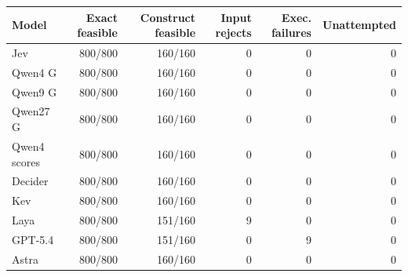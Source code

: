 \begin{tabular}{lrrrrr}
\toprule
Model & Exact feasible & Construct feasible & Input rejects & Exec. failures & Unattempted \\
\midrule
Jev & 800/800 & 160/160 & 0 & 0 & 0 \\
Qwen4 G & 800/800 & 160/160 & 0 & 0 & 0 \\
Qwen9 G & 800/800 & 160/160 & 0 & 0 & 0 \\
Qwen27 G & 800/800 & 160/160 & 0 & 0 & 0 \\
Qwen4 scores & 800/800 & 160/160 & 0 & 0 & 0 \\
Decider & 800/800 & 160/160 & 0 & 0 & 0 \\
Kev & 800/800 & 160/160 & 0 & 0 & 0 \\
Laya & 800/800 & 151/160 & 9 & 0 & 0 \\
\midrule
GPT-5.4 & 800/800 & 151/160 & 0 & 9 & 0 \\
Astra & 800/800 & 160/160 & 0 & 0 & 0 \\
\bottomrule
\end{tabular}
